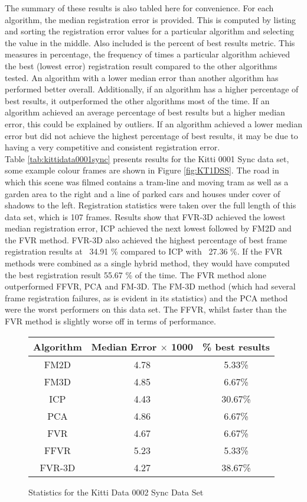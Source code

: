 The summary of these results is also tabled here for convenience. For each algorithm, the median registration error is provided. This is computed by listing and sorting the registration error values for a particular algorithm and selecting the value in the middle. Also included is the percent of best results metric. This measures in percentage, the frequency of times a particular algorithm achieved the best (lowest error) registration result compared to the other algorithms tested. An algorithm with a lower median error than another algorithm has performed better overall. Additionally, if an algorithm has a higher percentage of best results, it outperformed the other algorithms most of the time. If an algorithm achieved an average percentage of best results but a higher median error, this could be explained by outliers. If an algorithm achieved a lower median error but did not achieve the highest percentage of best results, it may be due to having a very competitive and consistent registration error. \\

Table \ref{tab:kittidata0001sync} presents results for the Kitti 0001 Sync data set, some example colour frames are shown in Figure \ref{fig:KT1DSS}. The road in which this scene was filmed contains a tram-line and moving tram as well as a garden area to the right and a line of parked cars and houses under cover of shadows to the left. Registration statistics were taken over the full length of this data set, which is 107 frames. Results show that FVR-3D achieved the lowest median registration error, ICP achieved the next lowest followed by FM2D and the FVR method. FVR-3D also achieved the highest percentage of best frame registration results at ~34.91 \% compared to ICP with ~27.36 \%. If the FVR methods were combined as a single hybrid method, they would have computed the best registration result 55.67 \% of the time. The FVR method alone outperformed FFVR, PCA and FM-3D. The FM-3D method (which had several frame registration failures, as is evident in its statistics) and the PCA method were the worst performers on this data set. The FFVR, whilst faster than the FVR method is slightly worse off in terms of performance. \\ 


\begin{figure}
\centering
\begin{tabular}{ccc}
\hline
\textbf{Algorithm} & \textbf{Median Error $\times$ 1000} & \textbf{\% best results}\\ \hline
FM2D	& 4.78 & 5.33\%\\
FM3D	& 4.85 & 6.67\%\\
ICP	& 4.43 & 30.67\%\\
PCA	& 4.86 & 6.67\%\\
FVR	& 4.67 & 6.67\%\\
FFVR	& 5.23 & 5.33\%\\
FVR-3D	& 4.27 & 38.67\%\\
\end{tabular}
\caption{Statistics for the Kitti Data 0002 Sync Data Set}
\label{tab:kittidata0002sync}
\end{figure} 



